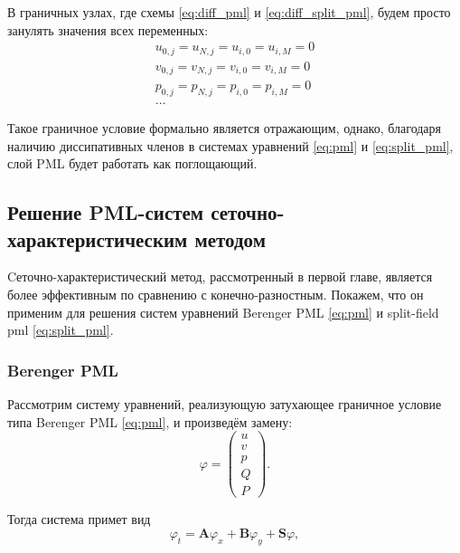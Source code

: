 \noindent В граничных узлах, где схемы \eqref{eq:diff_pml} и \eqref{eq:diff_split_pml}, будем просто занулять значения всех переменных:
\begin{equation}
    \begin{gathered}
        u_{0,j} = u_{N,j} = u_{i,0} = u_{i,M} = 0 \\
        v_{0,j} = v_{N,j} = v_{i,0} = v_{i,M} = 0 \\
        p_{0,j} = p_{N,j} = p_{i,0} = p_{i,M} = 0 \\
        \dots
    \end{gathered}
    \label{eq:pml_border}
\end{equation}
    
Такое граничное условие формально является отражающим, однако, благодаря наличию диссипативных членов в системах уравнений \eqref{eq:pml} и \eqref{eq:split_pml}, слой PML будет работать как поглощающий.

\subsection{Решение PML-систем сеточно-характеристи\-ческим методом}
    
Cеточно-характеристический метод, рассмотренный в первой главе, является более эффективным по сравнению с конечно-разностным. Покажем, что он применим для решения систем уравнений Berenger PML \eqref{eq:pml} и split-field pml \eqref{eq:split_pml}.
    
\subsubsection{Berenger PML}
    
Рассмотрим систему уравнений, реализующую затухающее граничное условие типа Berenger PML \eqref{eq:pml}, и произведём замену:
\begin{equation*}
    \varphi = \begin{pmatrix}
        u \\ v \\ p \\ Q \\ P
    \end{pmatrix} .
\end{equation*}
    
\noindent Тогда система примет вид
\begin{equation}
    \varphi_t = \pmb{A}\varphi_x + \pmb{B}\varphi_y + \pmb{S}\varphi ,
    \label{eq:gcm_berenger_pml}
\end{equation}

